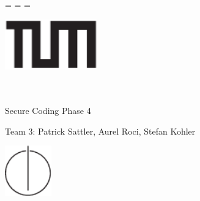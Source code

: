 \begin{titlepage}
  \oddsidemargin=\evensidemargin\relax
  \textwidth=\dimexpr{}\evensidemargin-2in\relax
  \hsize=\textwidth\relax

  \centering

  \includegraphics[width=40mm]{logos/tum}

  \vspace{5mm}
  {\huge\MakeUppercase{\getFaculty{}}}\\

  \vspace{5mm}
  {\large\MakeUppercase{\getUniversity{}}}\\

  \vspace{20mm}
  {\Large Secure Coding Phase 4}

  \vspace{15mm}

  \vspace{15mm}
  {\LARGE Team 3:
  	 Patrick Sattler, Aurel Roci, Stefan Kohler}

  \vspace{20mm}
  \includegraphics[width=20mm]{logos/faculty}
\end{titlepage}
